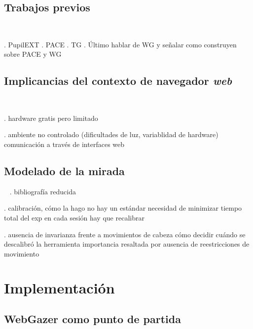 \documentclass{beamer}
\begin{document}
\subsection{Trabajos previos}

\begin{frame}{~}

. PupilEXT
. PACE
. TG
. Último hablar de WG y señalar como construyen sobre PACE y WG

\end{frame}

\subsection{Implicancias del contexto de navegador \textit{web}}

\begin{frame}{~}

. hardware gratis pero limitado

. ambiente no controlado (dificultades de luz, variablidad de hardware)
  comunicación a través de interfaces web

\end{frame}

\subsection{Modelado de la mirada}

\begin{frame}{~}
. bibliografía reducida

. calibración, cómo la hago
  no hay un estándar
  necesidad de minimizar tiempo total del exp
  en cada sesión hay que recalibrar

. ausencia de invarianza frente a movimientos de cabeza
  cómo decidir cuándo se descalibró la herramienta
  importancia resaltada por ausencia de reestricciones de movimiento
\end{frame}

\section{Implementación}

\subsection{WebGazer como punto de partida}
\end{document}
